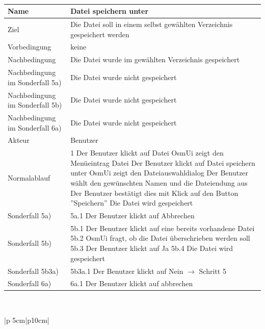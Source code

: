\documentclass[a4paper,12pt]{scrartcl}
\begin{document}
\begin{center}
\\
\begin{tabular}{|p{5cm}|p{10cm}|}
\hline Name & \textbf{Datei speichern unter} \\ 
\hline Ziel & Die Datei soll in einem selbst gewählten Verzeichnis gespeichert werden \\ 
\hline Vorbedingung & keine \\ 
\hline Nachbedingung & Die Datei wurde im gewählten Verzeichnis gespeichert\\ 
\hline Nachbedingung im Sonderfall 5a)& Die Datei wurde nicht gespeichert\\ 
\hline Nachbedingung im Sonderfall 5b)& Die Datei wurde nicht gespeichert\\
\hline Nachbedingung im Sonderfall 6a)& Die Datei wurde nicht gespeichert\\ 
\hline Akteur & Benutzer \\ 
\hline Normalablauf & 1 Der Benutzer klickt auf Datei
\newline 2 OsmUi zeigt den Menüeintrag Datei
\newline 3 Der Benutzer klickt auf Datei speichern unter
\newline 4 OsmUi zeigt den Dateiauswahldialog
\newline 5 Der Benutzer wählt den gewünschten Namen und die Dateiendung aus
\newline 6 Der Benutzer bestätigt dies mit Klick auf den Button ''Speichern'' 
\newline 7 Die Datei wird gespeichert\\
\hline Sonderfall 5a) & 5a.1 Der Benutzer klickt auf Abbrechen\\
\hline Sonderfall 5b) & 5b.1 Der Benutzer klickt auf eine bereits vorhandene Datei
\newline 5b.2 OsmUi fragt, ob die Datei überschrieben werden soll
\newline 5b.3 Der Benutzer klickt auf Ja
\newline 5b.4 Die Datei wird gespeichert\\
\hline Sonderfall 5b3a) & 5b3a.1 Der Benutzer klickt auf Nein
\newline $ \rightarrow$ Schritt 5\\
\hline Sonderfall 6a) & 6a.1 Der Benutzer klickt auf abbrechen\\
\hline 
\end{tabular}
\vspace{0.7cm}
\\
\begin{tabular}{|p {5cm}|p{10cm}|}

\end{tabular}
\end{center}
\end{document}
